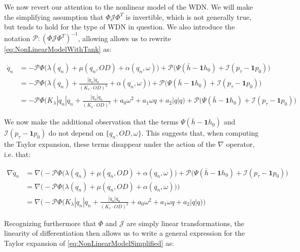 We now revert our attention to the nonlinear model of the WDN. We will make the simplifying assumption that $\Phi \mathcal{J} \Phi^T$ is invertible, which is not generally true, but tends to hold for the type of WDN in question. We also introduce the notation $\mathcal{P}: (\Phi \mathcal{J} \Phi^T)^{-1}$, allowing allows us to rewrite \cref{eq:NonLinearModelWithTank} as:

\begin{equation}\label{eq:NonLinearModelSimplified}
	\begin{split}
		\dot{q}_n &=  -\mathcal{P}\Phi\Big(\lambda(q_n)+\mu(q_n,OD)+\alpha(q_n,\omega)\Big) + \mathcal{P}\Big(\Psi(\bar{h}-\mathbf{1}h_0) + \mathcal{I}(p_{\tau}-\mathbf{1}p_0)\Big) \\
		&= 	-\mathcal{P}\Phi\Big(\lambda(q_n)+\frac{|q_n|q_n}{(K_v\cdot OD)^2}+\alpha(q_n,\omega)\Big) + 	\mathcal{P}\Big(\Psi(\bar{h}-\mathbf{1}h_0) + \mathcal{I}(p_{\tau}-\mathbf{1}p_0)\Big) \\
		& = -\mathcal{P}\Phi\Big(K_\lambda|q_n|q_n+\frac{|q_n|q_n}{(K_v\cdot OD)^2}+a_0\omega^2+a_1\omega q+a_2|q|q\Big) + \mathcal{P}\Big(\Psi(\bar{h}-\mathbf{1}h_0) + \mathcal{I}(p_{\tau}-\mathbf{1}p_0)\Big)
	\end{split}	
\end{equation}

We now make the additional observation that the terms $\Psi(\bar{h}-\mathbf{1}h_0)$ and  $\mathcal{I}(p_{\tau}-\mathbf{1}p_0)$ do not depend on $\{q_n,OD,\omega\}$. This suggests that, when computing the Taylor expansion, these terms disappear under the action of the $\nabla$ operator, i.e. that:

\begin{equation}\label{eq:PressureHeightDisappear}
	\begin{split}
		\nabla \dot{q}_n &= \nabla \Big(-\mathcal{P}\Phi\Big(\lambda(q_n)+\mu(q_n,OD)+\alpha(q_n,\omega)\Big) + \mathcal{P}\Big(\Psi(\bar{h}-\mathbf{1}h_0) + \mathcal{I}(p_{\tau}-\mathbf{1}p_0)\Big) \\ 
		&=\nabla \Big(-\mathcal{P}\Phi\Big(\lambda(q_n)+\mu(q_n,OD)+\alpha(q_n,\omega)\Big)\Big) \\
		&=\nabla \Big(-\mathcal{P}\Phi\Big(K_\lambda|q_n|q_n+\frac{|q_n|q_n}{(K_v\cdot OD)^2}+a_0\omega^2+a_1\omega q+a_2|q|q\Big)\Big)
	\end{split}
\end{equation}

Recognizing furthermore that $\Phi$ and $\mathcal{J}$ are simply linear transformations, the linearity of differentiation then allows us to write a general expression for the Taylor expansion of \cref{eq:NonLinearModelSimplified} as:

